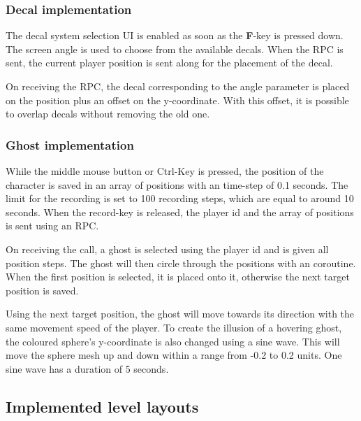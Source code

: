 \subsubsection{Decal implementation}

The decal system selection UI is enabled as soon as the \textbf{F}-key is pressed down. The screen angle is used to choose from the available decals. When the RPC is sent, the current player position is sent along for the placement of the decal.

On receiving the RPC, the decal corresponding to the angle parameter is placed on the position plus an offset on the y-coordinate. With this offset, it is possible to overlap decals without removing the old one.

\subsubsection{Ghost implementation}

While the middle mouse button or Ctrl-Key is pressed, the position of the character is saved in an array of positions with an time-step of 0.1 seconds. The limit for the recording is set to 100 recording steps, which are equal to around 10 seconds.
When the record-key is released, the player id and the array of positions is sent using an RPC.

On receiving the call, a ghost is selected using the player id and is given all position steps. The ghost will then circle through the positions with an coroutine. When the first position is selected, it is placed onto it, otherwise the next target position is saved. 

Using the next target position, the ghost will move towards its direction with the same movement speed of the player. To create the illusion of a hovering ghost, the coloured sphere's y-coordinate is also changed using a sine wave. This will move the sphere mesh up and down within a range from -0.2 to 0.2 units. One sine wave has a duration of 5 seconds.



\newpage
\subsection{Implemented level layouts}
\label{section:level layouts}

